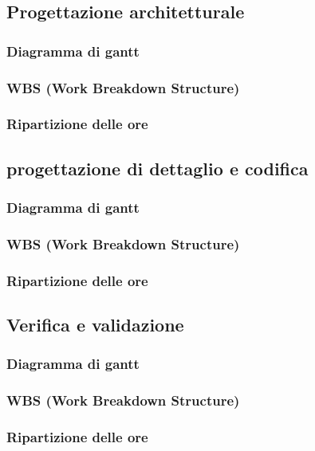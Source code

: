 		\subsection{Progettazione architetturale}
			\subsubsection{Diagramma di gantt}
			\subsubsection{WBS (Work Breakdown Structure)}
			\subsubsection{Ripartizione delle ore}
			
		\subsection{progettazione di dettaglio e codifica}
			\subsubsection{Diagramma di gantt}
			\subsubsection{WBS (Work Breakdown Structure)}
			\subsubsection{Ripartizione delle ore}
			
		\subsection{Verifica e validazione}
			\subsubsection{Diagramma di gantt}
			\subsubsection{WBS (Work Breakdown Structure)}
			\subsubsection{Ripartizione delle ore}
			
		
